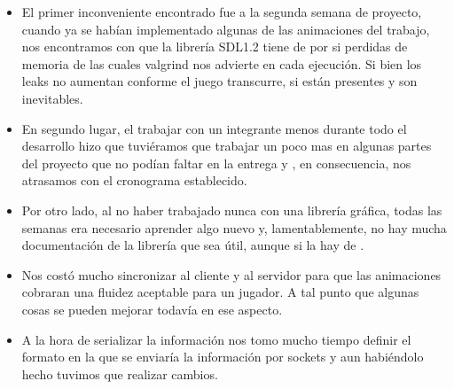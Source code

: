\begin{itemize}
    \item El primer inconveniente encontrado fue a la segunda semana de
    proyecto, cuando ya se habían implementado algunas de las animaciones del
    trabajo, nos encontramos con que la librería SDL1.2 tiene de por si perdidas
    de memoria de las cuales valgrind nos advierte en cada ejecución. Si bien
    los leaks no aumentan conforme el juego transcurre, si están presentes y son
    inevitables.
    \item En segundo lugar, el trabajar con un integrante menos durante todo el
    desarrollo hizo que tuviéramos que trabajar un poco mas en algunas partes
    del proyecto que no podían faltar en la entrega y , en consecuencia, nos
    atrasamos con el cronograma establecido.
    \item Por otro lado, al no haber trabajado nunca con una librería gráfica,
    todas las semanas era necesario aprender algo nuevo y, lamentablemente,
    no hay mucha documentación de la librería  que sea útil,
    aunque si la hay de .
    \item Nos costó mucho sincronizar al cliente y al servidor para que las
    animaciones cobraran una fluidez aceptable para un jugador. A tal punto que
    algunas cosas se pueden mejorar todavía en ese aspecto.
    \item A la hora de serializar la información nos tomo mucho tiempo definir
    el formato en la que se enviaría la información por sockets y aun habiéndolo
    hecho tuvimos que realizar cambios.
\end{itemize}